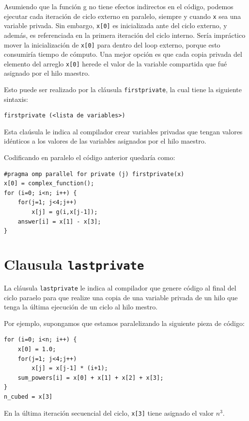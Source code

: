 \documentclass[12pt,letterpaper]{book}
\begin{document}
Asumiendo que la función g no tiene efectos indirectos en el código, podemos ejecutar cada iteración de ciclo externo en paralelo, siempre y cuando \texttt{x} sea una variable privada. Sin embargo, \texttt{x[0]} es inicializada ante del ciclo externo, y además, es referenciada en la primera iteración del ciclo interno. Sería impráctico mover la inicialización de \texttt{x[0]} para dentro del loop externo, porque esto consumiría tiempo de cómputo. Una mejor opción es que cada copia privada del elemento del arreglo \texttt{x[0]} herede el valor de la variable compartida que fué asignado por el hilo maestro.

Esto puede ser realizado por la cláusula \texttt{firstprivate}, la cual tiene la siguiente sintaxis:

\begin{lstlisting}[style=C]
firstprivate (<lista de variables>)
\end{lstlisting}

Esta claúsula le indica al compilador crear variables privadas que tengan valores idénticos a  los valores de las variables asignados por el hilo maestro.

Codificando en paralelo el código anterior quedaría como:

\begin{lstlisting}[style=C]
#pragma omp parallel for private (j) firstprivate(x)
x[0] = complex_function(); 
for (i=0; i<n; i++) {
	for(j=1; j<4;j++) 
		x[j] = g(i,x[j-1]);
	answer[i] = x[1] - x[3];
}
\end{lstlisting}

\section{Clausula \texttt{lastprivate}}

La cláusula \texttt{lastprivate} le indica al compilador que genere código al final del ciclo paraelo para que realize una copia de una variable privada de un hilo que tenga la última ejecución de un ciclo al hilo mestro.

Por ejemplo, supongamos que estamos paralelizando la siguiente pieza de código:

\begin{lstlisting}[style=C]
for (i=0; i<n; i++) {
	x[0] = 1.0;
	for(j=1; j<4;j++) 
		x[j] = x[j-1] * (i+1);
	sum_powers[i] = x[0] + x[1] + x[2] + x[3];
}
n_cubed = x[3]
\end{lstlisting}

En la última iteración secuencial del ciclo, \texttt{x[3]} tiene asignado el valor $n^3$.
\end{document}
